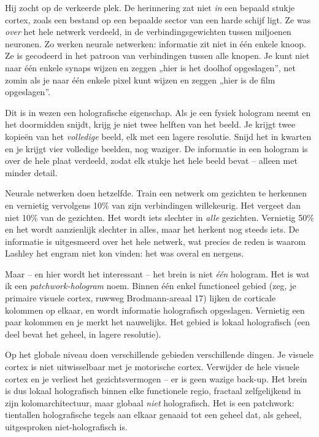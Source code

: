 \documentclass[11pt, twoside, openright]{book}
\begin{document}
Hij zocht op de verkeerde plek. De herinnering zat niet \textit{in} een bepaald stukje cortex, zoals een bestand op een bepaalde sector van een harde schijf ligt. Ze was \textit{over} het hele netwerk verdeeld, in de verbindingsgewichten tussen miljoenen neuronen. Zo werken neurale netwerken: informatie zit niet in één enkele knoop. Ze is gecodeerd in het patroon van verbindingen tussen alle knopen. Je kunt niet naar één enkele synaps wijzen en zeggen „hier is het doolhof opgeslagen”, net zomin als je naar één enkele pixel kunt wijzen en zeggen „hier is de film opgeslagen”.

Dit is in wezen een holografische eigenschap. Als je een fysiek hologram neemt en het doormidden snijdt, krijg je niet twee helften van het beeld. Je krijgt twee kopieën van het \textit{volledige} beeld, elk met een lagere resolutie. Snijd het in kwarten en je krijgt vier volledige beelden, nog waziger. De informatie in een hologram is over de hele plaat verdeeld, zodat elk stukje het hele beeld bevat -- alleen met minder detail.

Neurale netwerken doen hetzelfde. Train een netwerk om gezichten te herkennen en vernietig vervolgens 10\% van zijn verbindingen willekeurig. Het vergeet dan niet 10\% van de gezichten. Het wordt iets slechter in \textit{alle} gezichten. Vernietig 50\% en het wordt aanzienlijk slechter in alles, maar het herkent nog steeds iets. De informatie is uitgesmeerd over het hele netwerk, wat precies de reden is waarom Lashley het engram niet kon vinden: het was overal en nergens.

Maar -- en hier wordt het interessant -- het brein is niet \textit{één} hologram. Het is wat ik een \textit{patchwork-hologram} noem. Binnen één enkel functioneel gebied (zeg, je primaire visuele cortex, ruwweg Brodmann-areaal 17) lijken de corticale kolommen op elkaar, en wordt informatie holografisch opgeslagen. Vernietig een paar kolommen en je merkt het nauwelijks. Het gebied is lokaal holografisch (een deel bevat het geheel, in lagere resolutie).

Op het globale niveau doen verschillende gebieden verschillende dingen. Je visuele cortex is niet uitwisselbaar met je motorische cortex. Verwijder de hele visuele cortex en je verliest het gezichtsvermogen -- er is geen wazige back-up. Het brein is dus lokaal holografisch binnen elke functionele regio, fractaal zelfgelijkend in zijn kolomarchitectuur, maar globaal \textit{niet} holografisch. Het is een patchwork: tientallen holografische tegels aan elkaar genaaid tot een geheel dat, als geheel, uitgesproken niet-holografisch is.
\end{document}
